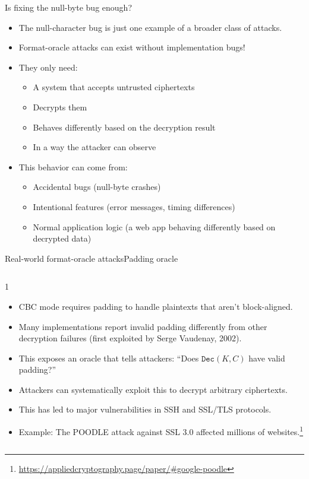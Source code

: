 \ifdefined\PRESENTATION\else\PassOptionsToClass{handout}{beamer}\fi\documentclass[aspectratio=169, lualatex]{beamer}
\begin{document}
\begin{frame}{Is fixing the null-byte bug enough?}
	\begin{itemize}[<+->]
		\item The null-character bug is just one example of a broader class of attacks.
		\item Format-oracle attacks can exist without implementation bugs!
		\item They only need:
		      \begin{itemize}
			      \item A system that accepts untrusted ciphertexts
			      \item Decrypts them
			      \item Behaves differently based on the decryption result
			      \item In a way the attacker can observe
		      \end{itemize}
		\item This behavior can come from:
		      \begin{itemize}
			      \item Accidental bugs (null-byte crashes)
			      \item Intentional features (error messages, timing differences)
			      \item Normal application logic (a web app behaving differently based on decrypted data)
		      \end{itemize}
	\end{itemize}
\end{frame}

\begin{frame}{Real-world format-oracle attacks}{Padding oracle}
	\begin{columns}[c]
		\begin{column}{1\textwidth}
			\begin{itemize}[<+->]
				\item CBC mode requires padding to handle plaintexts that aren't block-aligned.
				\item Many implementations report invalid padding differently from other decryption failures (first exploited by Serge Vaudenay, 2002).
				\item This exposes an oracle that tells attackers: ``Does $\texttt{Dec}(K, C)$ have valid padding?''
				\item Attackers can systematically exploit this to decrypt arbitrary ciphertexts.
				\item This has led to major vulnerabilities in SSH and SSL/TLS protocols.
				\item Example: The POODLE attack against SSL 3.0 affected millions of websites.\footnote{\url{https://appliedcryptography.page/paper/\#google-poodle}}
			\end{itemize}
		\end{column}
	\end{columns}
\end{frame}
\end{document}
